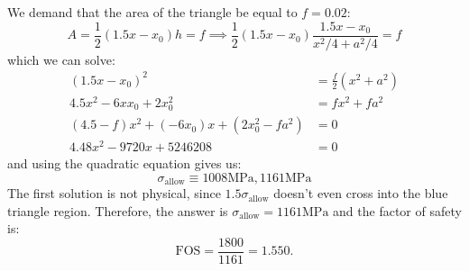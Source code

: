 \documentclass{article}
\begin{document}
We demand that the area of the triangle be equal to $f=0.02$:
\begin{equation}
    A = \frac{1}{2}(1.5x-x_0)h = f \implies \frac{1}{2}(1.5x-x_0)\frac{1.5x-x_0}{x^2/4+a^2/4}=f
    \label{eq:}
\end{equation}
which we can solve:
\begin{align}
    (1.5x-x_0)^2&=\frac{f}{2}(x^2+a^2)\\
    4.5x^2-6xx_0+2x_0^2 &=fx^2+fa^2\\ 
    (4.5-f)x^2+(-6x_0)x+(2x_0^2-fa^2) &= 0 \\
    4.48x^2-9720x+5246208&= 0
\end{align}
and using the quadratic equation gives us:
\begin{equation}
    \sigma_\text{allow} \equiv 1008\si{\mega\pascal}, 1161 \si{\mega\pascal}
    \label{eq:}
\end{equation}
The first solution is not physical, since $1.5\sigma_\text{allow}$ doesn't even cross into the blue triangle region. Therefore, the answer is $\boxed{\sigma_\text{allow}=1161\si{\mega\pascal}}$ and the factor of safety is:
\begin{equation}
    \text{FOS} = \frac{1800}{1161}=1.550.
    \label{eq:}
\end{equation}
\newpage
\end{document}
